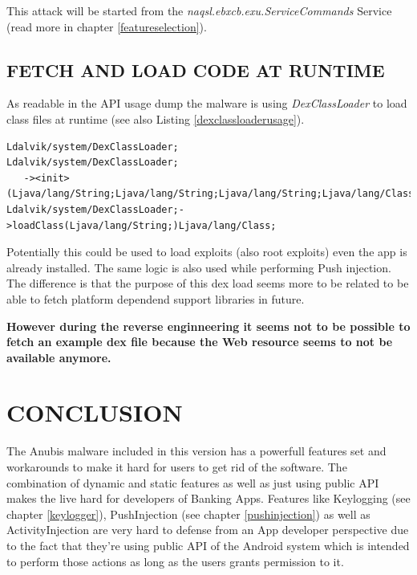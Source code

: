 \documentclass[10pt,titlepage]{article}
\begin{document}
This attack will be started from the \textit{naqsl.ebxcb.exu.ServiceCommands} Service (read more in chapter \ref{featureselection}).

            
\newpage
\subsection{FETCH AND LOAD CODE AT RUNTIME}
As readable in the API usage dump the malware is using \textit{DexClassLoader} to load class files at runtime (see also Listing \ref{dexclassloaderusage}).


\begin{lstlisting}[label=dexclassloaderusage,caption=The malware is using \textit{dalvik.system.DexClassLoader} and is able to load code at runtime for example from a Web resource.,frame=tb]
Ldalvik/system/DexClassLoader;
Ldalvik/system/DexClassLoader;
   -><init>(Ljava/lang/String;Ljava/lang/String;Ljava/lang/String;Ljava/lang/ClassLoader;)
Ldalvik/system/DexClassLoader;->loadClass(Ljava/lang/String;)Ljava/lang/Class;
\end{lstlisting}

Potentially this could be used to load exploits (also root exploits) even the app is already installed. The same logic is also used while performing Push injection. The difference is that the purpose of this dex load seems more to be related to be able to fetch platform dependend support libraries in future.

\textbf{However during the reverse enginneering it seems not to be possible to fetch an example dex file because the Web resource seems to not be available anymore.}




\section{CONCLUSION}
The Anubis malware included in this version has a powerfull features set and workarounds to make it hard for users to get rid of the software. The combination of dynamic and static features as well as just using public API makes the live hard for developers of Banking Apps. Features like Keylogging (see chapter \ref{keylogger}), PushInjection (see chapter \ref{pushinjection}) as well as ActivityInjection are very hard to defense from an App developer perspective due to the fact that they're using public API of the Android system which is intended to perform those actions as long as the users grants permission to it.
\end{document}
